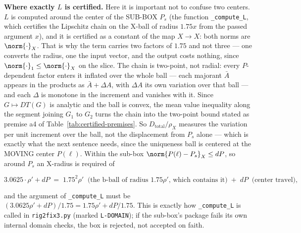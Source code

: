 \textbf{Where exactly $L$ is certified.} Here it is important not to confuse two
centers. $L$ is computed around the center of the SUB-BOX $P_s$ (the function
\texttt{\_compute\_L}, which certifies the Lipschitz chain on the X-ball of radius $1.75x$
from the passed argument $x$), and it is certified as a constant of the map
$X \to X$: both norms are $\norm{\cdot}_X$. That is why the term carries
two factors of $1.75$ and not three --- one converts the radius, one the input
vector, and the output costs nothing, since $\norm{\cdot}_1 \le \norm{\cdot}_X$
on the slice.
The chain is two-point, not radial: every $P$-dependent factor enters it
inflated over the whole ball --- each majorant $\bar A$ appears in the products
as $\bar A + \Delta A$, with $\Delta A$ its own variation over that ball --- and
each $\Delta$ is monotone in the increment and vanishes with it. Since
$G\mapsto DT(G)$ is analytic and the ball is convex, the mean value inequality
along the segment joining $G_1$ to $G_2$ turns the chain into the two-point
bound stated as premise a4 of Table~\ref{tab:certified-premises}. So $D_{\mathrm{total}}/\rho_X$ measures the variation per unit
increment over the ball, not the displacement from $P_s$ alone --- which is
exactly what the next sentence needs, since the uniqueness ball is centered at
the
MOVING center $P(\ell)$. Within the sub-box $\norm{P(\ell) - P_s}_X \le dP$, so around $P_s$
an X-radius is required of

\[
3.0625 \cdot \rho' + dP \; = \; 1.75^2 \rho' \;\; \text{(the b-ball of radius } 1.75\rho'\text{, which contains it)} \;+\; dP \;\; \text{(center travel)},
\]

and the argument of \texttt{\_compute\_L} must be $(3.0625\rho' + dP)/1.75 = 1.75\rho' + dP/1.75$. This is exactly how \texttt{\_compute\_L} is called in \texttt{rig2fix3.py} (marked
\texttt{L-DOMAIN}); if the sub-box's package fails its own internal domain checks, the
box is rejected, not accepted on faith.

